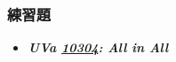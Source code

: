\subsubsection*{練習題}
\begin{itemize}[label={\Checkmark}]
\item \textbf{\textit{UVa \href{http://uva.onlinejudge.org/external/103/10304.html}{10304}: All in All}}\\

\end{itemize}